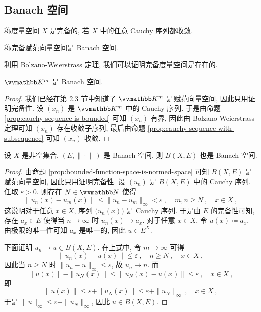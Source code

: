 \subsection{Banach 空间}

\begin{definition}[完备性]
    称度量空间 \(X\) 是完备的, 若 \(X\) 中的任意 Cauchy 序列都收敛.
\end{definition}

\begin{definition}[Banach 空间]
    称完备赋范向量空间是 Banach 空间.
\end{definition}

利用 Bolzano-Weierstrass 定理, 我们可以证明完备度量空间是存在的.

\begin{theorem}\label{thm:Km-is-banach-space}
    \(\K^m\) 是 Banach 空间.
\end{theorem}

\begin{proof}
    我们已经在第 2.3 节中知道了 \(\K^m\) 是赋范向量空间, 因此只用证明完备性. 设 \((x_n)\) 是 \(\K^m\) 中的 Cauchy 序列. 于是由命题 \ref{prop:cauchy-sequence-is-bounded} 可知 \((x_n)\) 有界, 因此由 Bolzano-Weierstrass 定理可知 \((x_n)\) 存在收敛子序列, 最后由命题 \ref{prop:cauchy-sequence-with-subsequence} 可知 \((x_n)\) 收敛.
\end{proof}

\begin{theorem}
    设 \(X\) 是非空集合, \((E, \|\!\cdot\!\|)\) 是 Banach 空间. 则 \(B(X, E)\) 也是 Banach 空间.
\end{theorem}

\begin{proof}
    由命题 \ref{prop:bounded-function-space-is-normed-space} 可知 \(B(X, E)\) 是赋范向量空间, 因此只用证明完备性. 设 \((u_n)\) 是 \(B(X, E)\) 中的 Cauchy 序列. 任取 \(\varepsilon > 0\). 则存在 \(N \in \N\) 使得
    \[
        \|u_n(x) - u_m(x)\| \leq \|u_n - u_m\|_\infty < \varepsilon\ ,\quad m, n \geq N\ , \quad x \in X\ ,
    \]
    这说明对于任意 \(x \in X\), 序列 \(\bigl(u_n(x)\bigr)\) 是 Cauchy 序列. 于是由 \(E\) 的完备性可知, 存在 \(a_x \in E\) 使得当 \(n \to \infty\) 时 \(u_n(x) \to a_x\). 对于任意 \(x \in X\), 令 \(u(x) \coloneqq a_x\), 由极限的唯一性可知 \(a_x\) 是唯一的, 因此 \(u \in E^X\).

    下面证明 \(u_n \to u \in B(X, E)\). 在上式中, 令 \(m \to \infty\) 可得
    \[
        \|u_n(x) - u(x)\| \leq \varepsilon\ ,\quad n \geq N\ ,\quad x \in X\ ,
    \]
    因此当 \(n \geq N\) 时 \(\|u_n - u\|_\infty \leq \varepsilon\), 故 \(u_n \to n\). 而
    \[
        \|u(x)\| - \|u_N(x)\| \leq \|u_N(x) - u(x)\| \leq \varepsilon\ ,\quad x \in X\ ,
    \]
    即
    \[
        \|u(x)\| \leq \varepsilon + \|u_N(x)\| \leq \varepsilon + \|u_N\|_\infty\ ,\quad x \in X\ ,
    \]
    于是 \(\|u\|_\infty \leq \varepsilon + \|u_N\|_\infty\), 因此 \(u \in B(X, E)\).
\end{proof}

